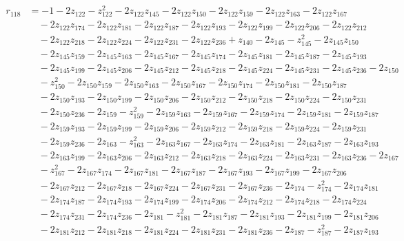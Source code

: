 \begin{align*}
r_{118} &=-1-2z_{122}-z_{122}^{2}-2z_{122}z_{145}-2z_{122}z_{150}-2z_{122}z_{159}-2z_{122}z_{163}-2z_{122}z_{167}\\
&\quad -2z_{122}z_{174}-2z_{122}z_{181}-2z_{122}z_{187}-2z_{122}z_{193}-2z_{122}z_{199}-2z_{122}z_{206}-2z_{122}z_{212}\\
&\quad -2z_{122}z_{218}-2z_{122}z_{224}-2z_{122}z_{231}-2z_{122}z_{236}+z_{140}-2z_{145}-z_{145}^{2}-2z_{145}z_{150}\\
&\quad -2z_{145}z_{159}-2z_{145}z_{163}-2z_{145}z_{167}-2z_{145}z_{174}-2z_{145}z_{181}-2z_{145}z_{187}-2z_{145}z_{193}\\
&\quad -2z_{145}z_{199}-2z_{145}z_{206}-2z_{145}z_{212}-2z_{145}z_{218}-2z_{145}z_{224}-2z_{145}z_{231}-2z_{145}z_{236}-2z_{150}\\
&\quad -z_{150}^{2}-2z_{150}z_{159}-2z_{150}z_{163}-2z_{150}z_{167}-2z_{150}z_{174}-2z_{150}z_{181}-2z_{150}z_{187}\\
&\quad -2z_{150}z_{193}-2z_{150}z_{199}-2z_{150}z_{206}-2z_{150}z_{212}-2z_{150}z_{218}-2z_{150}z_{224}-2z_{150}z_{231}\\
&\quad -2z_{150}z_{236}-2z_{159}-z_{159}^{2}-2z_{159}z_{163}-2z_{159}z_{167}-2z_{159}z_{174}-2z_{159}z_{181}-2z_{159}z_{187}\\
&\quad -2z_{159}z_{193}-2z_{159}z_{199}-2z_{159}z_{206}-2z_{159}z_{212}-2z_{159}z_{218}-2z_{159}z_{224}-2z_{159}z_{231}\\
&\quad -2z_{159}z_{236}-2z_{163}-z_{163}^{2}-2z_{163}z_{167}-2z_{163}z_{174}-2z_{163}z_{181}-2z_{163}z_{187}-2z_{163}z_{193}\\
&\quad -2z_{163}z_{199}-2z_{163}z_{206}-2z_{163}z_{212}-2z_{163}z_{218}-2z_{163}z_{224}-2z_{163}z_{231}-2z_{163}z_{236}-2z_{167}\\
&\quad -z_{167}^{2}-2z_{167}z_{174}-2z_{167}z_{181}-2z_{167}z_{187}-2z_{167}z_{193}-2z_{167}z_{199}-2z_{167}z_{206}\\
&\quad -2z_{167}z_{212}-2z_{167}z_{218}-2z_{167}z_{224}-2z_{167}z_{231}-2z_{167}z_{236}-2z_{174}-z_{174}^{2}-2z_{174}z_{181}\\
&\quad -2z_{174}z_{187}-2z_{174}z_{193}-2z_{174}z_{199}-2z_{174}z_{206}-2z_{174}z_{212}-2z_{174}z_{218}-2z_{174}z_{224}\\
&\quad -2z_{174}z_{231}-2z_{174}z_{236}-2z_{181}-z_{181}^{2}-2z_{181}z_{187}-2z_{181}z_{193}-2z_{181}z_{199}-2z_{181}z_{206}\\
&\quad -2z_{181}z_{212}-2z_{181}z_{218}-2z_{181}z_{224}-2z_{181}z_{231}-2z_{181}z_{236}-2z_{187}-z_{187}^{2}-2z_{187}z_{193}\\

\end{align*}
